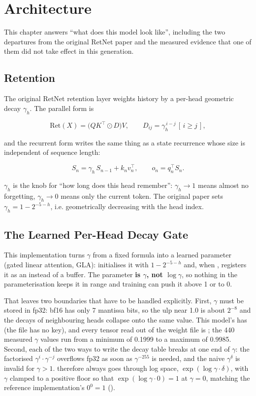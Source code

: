 \section{Architecture}

This chapter answers ``what does this model look like'', including the two departures from the
original RetNet paper and the measured evidence that one of them did not take effect in this
generation.

\subsection{Retention}

The original RetNet retention layer weights history by a per-head geometric decay $\gamma_h$.
The parallel form is

\[
\mathrm{Ret}(X)=\big(QK^{\top}\odot D\big)V,\qquad D_{ij}=\gamma_h^{\,i-j}\,[\,i\ge j\,],
\]

and the recurrent form writes the same thing as a state recurrence whose size is independent of
sequence length:

\[
S_n=\gamma_h\,S_{n-1}+k_n v_n^{\top},\qquad o_n=q_n^{\top}S_n .
\]

$\gamma_h$ is the knob for ``how long does this head remember'': $\gamma_h\to1$ means almost no
forgetting, $\gamma_h\to0$ means only the current token. The original paper sets
$\gamma_h=1-2^{-5-h}$, i.e. geometrically decreasing with the head index.

\subsection{The Learned Per-Head Decay Gate}

This implementation turns $\gamma$ from a fixed formula into a learned parameter (gated linear
attention, GLA):  initialises it with $1-2^{-5-h}$ and,
when , registers it as an  instead of a buffer. The
parameter \textbf{is $\gamma$, not $\log\gamma$}, so nothing in the parameterisation keeps it in
range and training can push it above 1 or to 0.

That leaves two boundaries that have to be handled explicitly. First, $\gamma$ must be stored in
fp32: bf16 has only 7 mantissa bits, so the ulp near 1.0 is about $2^{-8}$ and the decays of
neighbouring heads collapse onto the same value. This model's  has 
 (the file has no  key), and every tensor read out of the weight
file is ; the 440 measured $\gamma$ values run from a minimum of 0.1999 to a maximum of
0.9985. Second, each of the two ways to write the decay table breaks at one end of $\gamma$: the
factorised $\gamma^{i}\cdot\gamma^{-j}$ overflows fp32 as soon as $\gamma^{-255}$ is needed, and
the naive $\gamma^{\delta}$ is invalid for $\gamma>1$. 
therefore always goes through log space, $\exp(\log\gamma\cdot\delta)$, with $\gamma$ clamped to a
positive floor so that $\exp(\log\gamma\cdot 0)=1$ at $\gamma=0$, matching the reference
implementation's $0^0=1$ ().

